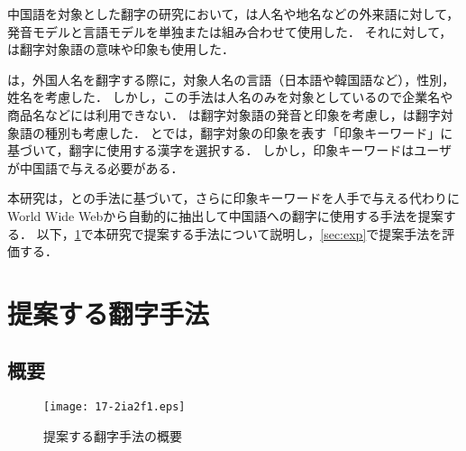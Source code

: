 \documentclass[japanese]{jnlp_1.4}
\begin{document}
中国語を対象とした翻字の研究において，\cite{Article_10,Article_16,Article_18}は人名や地名などの外来語に対して，発音モデルと言語モデルを単独または組み合わせて使用した．
それに対して，\cite{Article_11,Article_19,Article_21}は翻字対象語の意味や印象も使用した．

\cite{Article_11}は，外国人名を翻字する際に，対象人名の言語（日本語や韓国語など），性別，姓名を考慮した．
しかし，この手法は人名のみを対象としているので企業名や商品名などには利用できない．
\cite{Article_19}は翻字対象語の発音と印象を考慮し，\cite{Article_21}は翻字対象語の種別も考慮した．
\cite{Article_19}と\cite{Article_21}では，翻字対象の印象を表す「印象キーワード」に基づいて，翻字に使用する漢字を選択する．
しかし，印象キーワードはユーザが中国語で与える必要がある．

本研究は，\cite{Article_19}と\cite{Article_21}の手法に基づいて，さらに印象キーワードを人手で与える代わりにWorld Wide Webから自動的に抽出して中国語への翻字に使用する手法を提案する．
以下，\ref{sec:method}で本研究で提案する手法について説明し，\ref{sec:exp}で提案手法を評価する．


\section{提案する翻字手法}\label{sec:method}

\subsection{概要}\label{sec:overview}

\begin{figure}[b]
\begin{center}
\texttt{[image: 17-2ia2f1.eps]}
\end{center}
 \caption{提案する翻字手法の概要}
 \label{fig:1}
\end{figure}
\end{document}
